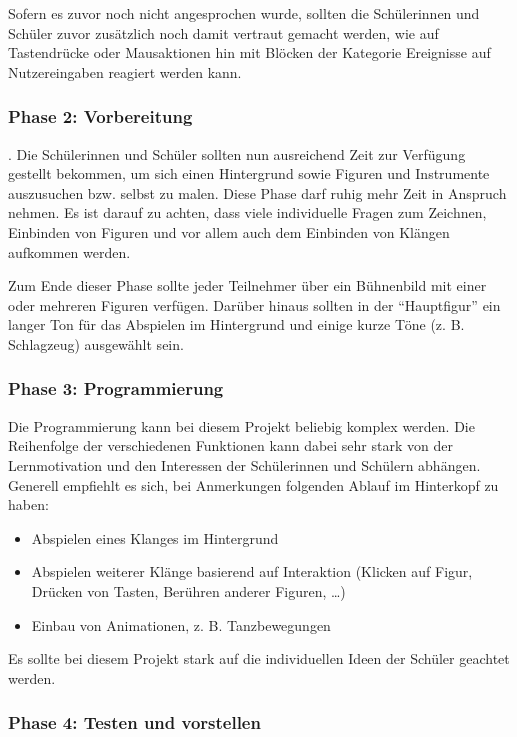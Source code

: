 Sofern es zuvor noch nicht angesprochen wurde, sollten die Schülerinnen
und Schüler zuvor zusätzlich noch damit vertraut gemacht werden, wie auf
Tastendrücke oder Mausaktionen hin mit Blöcken der Kategorie Ereignisse
auf Nutzereingaben reagiert werden kann.

\subsubsection{Phase 2: Vorbereitung}\label{phase-2-vorbereitung}

. Die Schülerinnen und Schüler sollten nun ausreichend Zeit zur
Verfügung gestellt bekommen, um sich einen Hintergrund sowie Figuren und
Instrumente auszusuchen bzw. selbst zu malen. Diese Phase darf ruhig
mehr Zeit in Anspruch nehmen. Es ist darauf zu achten, dass viele
individuelle Fragen zum Zeichnen, Einbinden von Figuren und vor allem
auch dem Einbinden von Klängen aufkommen werden.

Zum Ende dieser Phase sollte jeder Teilnehmer über ein Bühnenbild mit
einer oder mehreren Figuren verfügen. Darüber hinaus sollten in der
``Hauptfigur'' ein langer Ton für das Abspielen im Hintergrund und
einige kurze Töne (z. B. Schlagzeug) ausgewählt sein.

\subsubsection{Phase 3: Programmierung}\label{phase-3-programmierung}

Die Programmierung kann bei diesem Projekt beliebig komplex werden. Die
Reihenfolge der verschiedenen Funktionen kann dabei sehr stark von der
Lernmotivation und den Interessen der Schülerinnen und Schülern
abhängen. Generell empfiehlt es sich, bei Anmerkungen folgenden Ablauf
im Hinterkopf zu haben:

\begin{itemize}
\item
  Abspielen eines Klanges im Hintergrund
\item
  Abspielen weiterer Klänge basierend auf Interaktion (Klicken auf
  Figur, Drücken von Tasten, Berühren anderer Figuren, \ldots{})
\item
  Einbau von Animationen, z. B. Tanzbewegungen
\end{itemize}

Es sollte bei diesem Projekt stark auf die individuellen Ideen der
Schüler geachtet werden.

\subsubsection{Phase 4: Testen und
vorstellen}\label{phase-4-testen-und-vorstellen}

